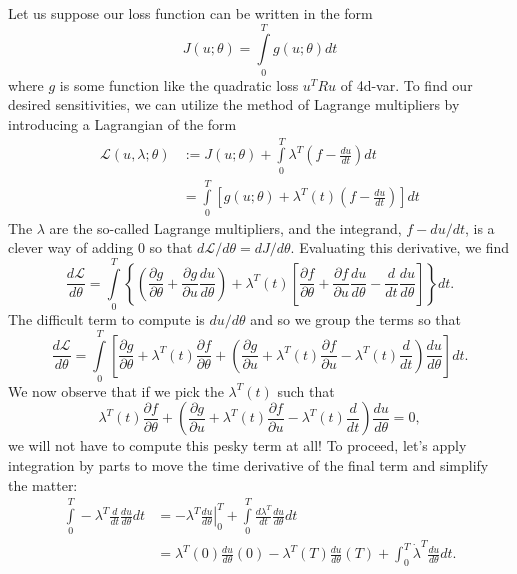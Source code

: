Let us suppose our loss function can be written in the form
\begin{equation}
  J(u;\theta) = \int\limits_0^T g(u;\theta)dt
\end{equation}
where $g$ is some function like the quadratic loss $u^TRu$ of 4d-var. To find our desired sensitivities, we can utilize the method of Lagrange multipliers by introducing a Lagrangian of the form
\begin{equation}
  \begin{aligned}
    \mathcal{L}(u,\lambda;\theta) &:= J(u;\theta) + \int\limits_0^T\lambda^T\left(f - \frac{du}{dt} \right)dt \\
    &= \int\limits_0^T \left[g(u;\theta) + \lambda^T(t) \left(f - \frac{du}{dt} \right) \right]dt
  \end{aligned}
\end{equation}
The $\lambda$ are the so-called Lagrange multipliers, and the integrand, $f-du/dt$, is a clever way of adding $0$ so that $d\mathcal{L}/d\theta = dJ/d\theta$. Evaluating this derivative, we find
\begin{equation}
  \frac{d\mathcal{L}}{d\theta} = \int\limits_0^T \left\{ \left( \frac{\partial g}{\partial \theta} + \frac{\partial g}{\partial u}\frac{du}{d\theta}\right)  + \lambda^T(t) \left[ \frac{\partial f}{\partial \theta} + \frac{\partial f}{\partial u}\frac{du}{d\theta} - \frac{d}{dt}\frac{du}{d\theta} \right] \right\}dt.
\end{equation}
The difficult term to compute is $du/d\theta$ and so we group the terms so that
\begin{equation}
  \frac{d\mathcal{L}}{d\theta} = \int\limits_0^T \left[ \frac{\partial g}{\partial \theta} + \lambda^T(t)\frac{\partial f}{\partial \theta} + \left(\frac{\partial g}{\partial u} + \lambda^T(t)\frac{\partial f}{\partial u} - \lambda^T(t)\frac{d}{dt}\right)\frac{du}{d\theta} \right] dt.
\end{equation}
We now observe that if we pick the $\lambda^T(t)$ such that
\begin{equation}
  \lambda^T(t)\frac{\partial f}{\partial \theta} + \left(\frac{\partial g}{\partial u} + \lambda^T(t)\frac{\partial f}{\partial u} - \lambda^T(t)\frac{d}{dt}\right)\frac{du}{d\theta}  = 0,
\end{equation}
we will not have to compute this pesky term at all! To proceed, let's apply integration by parts to move the time derivative of the final term and simplify the matter:
\begin{equation}
  \begin{aligned}
    \int\limits_0^T-\lambda^T\frac{d}{dt}\frac{du}{d\theta}dt &= \left. -\lambda^T\frac{du}{d\theta}\right\rvert_0^T + \int\limits_0^T \frac{d\lambda^T}{dt}\frac{du}{d\theta}dt \\
    &= \lambda^T(0)\frac{du}{d\theta}(0) - \lambda^T(T)\frac{du}{d\theta}(T) + \int_0^T\dot{\lambda}^T\frac{du}{d\theta}dt.
    \end{aligned}
\end{equation}
